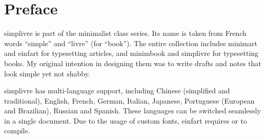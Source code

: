 \documentclass[puretext]{simplivre}
\providecommand{\minimalist}{\textsf{minimalist}}
\providecommand{\minimart}{\textsf{minimart}}
\providecommand{\minimbook}{\textsf{minimbook}}
\providecommand{\einfart}{\textsf{einfart}}
\providecommand{\simplivre}{\textsf{simplivre}}
\begin{document}


\frontmatter

\begin{titlepage} %
%
\end{titlepage}%
\cleardoublepage%

\chapter*{Preface}

\simplivre{} is part of the \minimalist{} class series. Its name is taken from French words ``simple'' and ``livre'' (for ``book''). The entire collection includes \minimart{} and \einfart{} for typesetting articles, and \minimbook{} and \simplivre{} for typesetting books. My original intention in designing them was to write drafts and notes that look simple yet not shabby.

\simplivre{} has multi-language support, including Chinese (simplified and traditional), English, French, German, Italian, Japanese, Portuguese (European and Brazilian), Russian and Spanish. These languages can be switched seamlessly in a single document. Due to the usage of custom fonts, \einfart{} requires  or  to compile.
\end{document}
